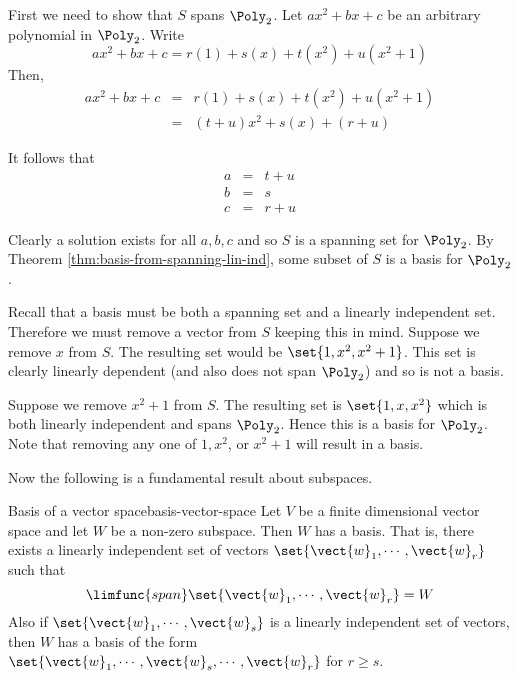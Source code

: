 \begin{solution}
First we need to show that $S$ spans $\Poly_2$. Let $ax^2 + bx + c$ be an arbitrary polynomial in $\Poly_2$. Write 
\[
ax^2 + bx + c = r(1) + s(x) + t(x^2) + u (x^2 + 1)
\]
Then,
\begin{eqnarray*}
ax^2 +bx + c &=& r(1) + s(x) + t(x^2) + u (x^2 + 1) \\
&=& (t+u) x^2 + s(x) + (r+u) 
\end{eqnarray*}

It follows that 
\begin{eqnarray*}
a &=& t + u \\
b &=& s \\
c &=& r + u 
\end{eqnarray*}

Clearly a solution exists for all $a,b,c$ and so $S$ is a spanning set for $\Poly_2$. By Theorem \ref{thm:basis-from-spanning-lin-ind}, some subset of $S$ is a basis for $\Poly_2$. 

Recall that a basis must be both a spanning set and a linearly independent set.
Therefore we must remove a vector from $S$ keeping this in mind. Suppose we remove $x$ from $S$. The resulting set would be $\set{1, x^2, x^2 + 1 }$. This set is clearly linearly dependent (and also does not span $\Poly_2$) and so is not a basis. 

Suppose we remove $x^2 + 1$ from $S$. The resulting set is $\set{1, x, x^2 }$ which is both linearly independent and spans $\Poly_2$. Hence this is a basis for $\Poly_2$. Note that removing any one of $1, x^2$, or $x^2 + 1$ will result in a basis.
\end{solution}

Now the following is a fundamental result about subspaces.

\begin{theorem}{Basis of a vector space}{basis-vector-space}
Let $V$ be a finite dimensional vector space and let $W$ be
a non-zero subspace. Then $W$ has a basis. That is, there exists a linearly
independent set of vectors $\set{\vect{w}_{1},\cdots ,\vect{w}_{r}} $
such that 
\begin{equation*}
\limfunc{span}\set{\vect{w}_{1},\cdots ,\vect{w}_{r}} =W
\end{equation*}
Also if $\set{\vect{w}_{1},\cdots ,\vect{w}_{s}} $ is a linearly
independent set of vectors, then $W$ has a basis of the form $\set{\vect{w}
_{1},\cdots ,\vect{w}_{s},\cdots ,\vect{w}_{r}} $ for $r\geq s$.
\end{theorem}


